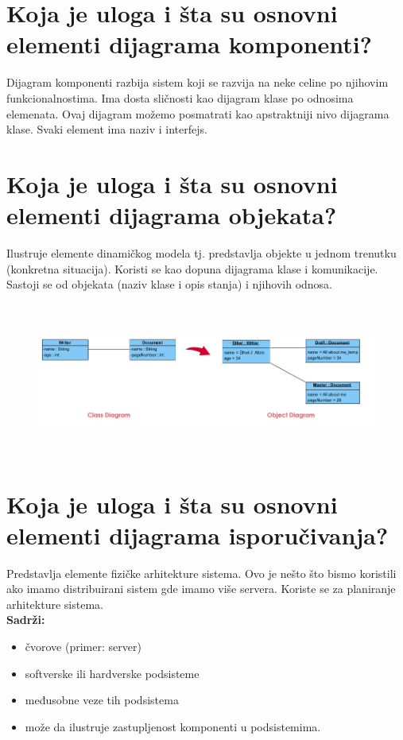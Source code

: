 \documentclass[a4paper]{article}
\begin{document}
\section{Koja je uloga i šta su osnovni elementi dijagrama komponenti?}
  Dijagram komponenti razbija sistem koji se razvija na neke celine po njihovim funkcionalnostima.
  Ima dosta sličnosti kao dijagram klase po odnosima elemenata. Ovaj dijagram možemo posmatrati
  kao apstraktniji nivo dijagrama klase. Svaki element ima naziv i interfejs.

\section{Koja je uloga i šta su osnovni elementi dijagrama objekata?}
  Ilustruje elemente dinamičkog modela tj. predstavlja objekte u jednom trenutku (konkretna situacija). 
  Koristi se kao dopuna dijagrama klase i komunikacije. Sastoji se od objekata (naziv klase i opis stanja)
  i njihovih odnosa.
  \begin{figure}[H]
    \begin{center}
        \includegraphics[width=120mm,height=50mm]{Slike/uml_objekat.png}
    \end{center}
  \end{figure} 

\section{Koja je uloga i šta su osnovni elementi dijagrama isporučivanja?}
  Predstavlja elemente fizičke arhitekture sistema. Ovo je nešto što bismo koristili 
  ako imamo distribuirani sistem gde imamo više servera. 
  Koriste se za planiranje arhitekture sistema. \\
  \textbf{Sadrži:}
  \begin{itemize} 
    \item čvorove (primer: server) 
    \item softverske ili hardverske podsisteme
    \item međusobne veze tih podsistema
    \item može da ilustruje zastupljenost komponenti u podsistemima.
  \end{itemize}
\end{document}
